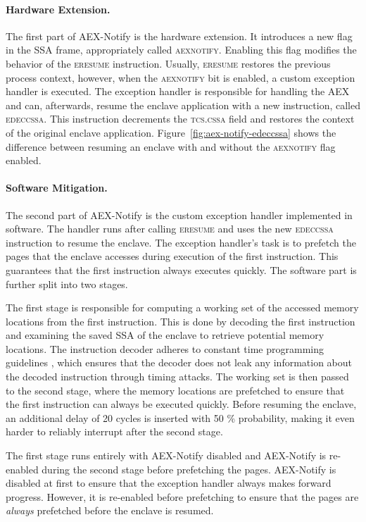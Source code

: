 \documentclass{llncs}
\begin{document}
\paragraph{Hardware Extension.}
The first part of AEX-Notify is the hardware extension.
It introduces a new flag in the SSA frame, appropriately called \textsc{aexnotify}.
Enabling this flag modifies the behavior of the \textsc{eresume} instruction.
Usually, \textsc{eresume} restores the previous process context, however, when
the \textsc{aexnotify} bit is enabled, a custom exception handler is executed.
The exception handler is responsible for handling the AEX and can, afterwards,
resume the enclave application with a new instruction, called \textsc{edeccssa}.
This instruction decrements the \textsc{tcs.cssa} field and restores the
context of the original enclave application.
Figure~\ref{fig:aex-notify-edeccssa} shows the difference between resuming an
enclave with and without the \textsc{aexnotify} flag enabled.

\paragraph{Software Mitigation.}
The second part of AEX-Notify is the custom exception handler implemented in
software.
The handler runs after calling \textsc{eresume} and
uses the new \textsc{edeccssa} instruction to resume the enclave.
The exception handler's task is to prefetch the pages that the enclave accesses
during execution of the first instruction.
This guarantees that the first instruction always executes quickly.
The software part is further split into two stages.

The first stage is responsible for computing a working set of the accessed
memory locations from the first instruction.
This is done by decoding the first instruction and examining the saved SSA of
the enclave to retrieve potential memory locations.
The instruction decoder adheres to constant time programming guidelines
\cite{Intel22}, which ensures that the decoder does not leak any information
about the decoded instruction through timing attacks.
The working set is then passed to the second stage, where the memory locations
are prefetched to ensure that the first instruction can always be executed
quickly.
Before resuming the enclave, an additional delay of 20 cycles is inserted with
50 \% probability, making it even harder to reliably interrupt after the second
stage.


The first stage runs entirely with AEX-Notify disabled
and AEX-Notify is re-enabled during the second stage before prefetching the pages.
AEX-Notify is disabled at first to ensure that the exception handler always
makes forward progress.
However, it is re-enabled before prefetching to ensure that the pages are
\emph{always} prefetched before the enclave is resumed.
\end{document}
